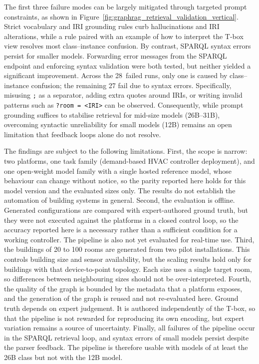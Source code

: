 \documentclass[twocolumn, 10pt, a4paper]{article}
\makeatletter
\renewcommand\section{\@startsection{section}{1}{\z@}{6pt}{3pt}{\normalfont\large\bfseries}}
\makeatother
\begin{document}
The first three failure modes can be largely mitigated through targeted prompt constraints, as shown in Figure~\ref{fig:graphrag_retrieval_validation_vertical}.
Strict vocabulary and IRI grounding rules curb hallucinations and IRI alterations, while a rule paired with an example of how to interpret the T-box view resolves most class--instance confusion.
By contrast, SPARQL syntax errors persist for smaller models.
Forwarding error messages from the SPARQL endpoint and enforcing syntax validation were both tested, but neither yielded a significant improvement.
Across the 28~failed runs, only one is caused by class--instance confusion; the remaining 27 fail due to syntax errors.
Specifically, misusing \texttt{;} as a separator, adding extra quotes around IRIs, or writing invalid patterns such as \texttt{?room = <IRI>} can be observed.
Consequently, while prompt grounding suffices to stabilise retrieval for mid-size models (26B--31B), overcoming syntactic unreliability for small models (12B) remains an open limitation that feedback loops alone do not resolve.


\section{Limitations and Conclusion}
\label{sec:limitations-conclusion}
The findings are subject to the following limitations.
First, the scope is narrow: two platforms, one task family (demand-based HVAC controller deployment), and one open-weight model family with a single hosted reference model, whose behaviour can change without notice, so the parity reported here holds for this model version and the evaluated sizes only. The results do not establish the automation of building systems in general.
Second, the evaluation is offline. Generated configurations are compared with expert-authored ground truth, but they were not executed against the platforms in a closed control loop, so the accuracy reported here is a necessary rather than a sufficient condition for a working controller. The pipeline is also not yet evaluated for real-time use.
Third, the buildings of 20 to 100 rooms are generated from two pilot installations. This controls building size and sensor availability, but the scaling results hold only for buildings with that device-to-point topology. Each size uses a single target room, so differences between neighbouring sizes should not be over-interpreted.
Fourth, the quality of the graph is bounded by the metadata that a platform exposes, and the generation of the graph is reused and not re-evaluated here. Ground truth depends on expert judgement. It is authored independently of the T-box, so that the pipeline is not rewarded for reproducing its own encoding, but expert variation remains a source of uncertainty.
Finally, all failures of the pipeline occur in the SPARQL retrieval loop, and syntax errors of small models persist despite the parser feedback. The pipeline is therefore usable with models of at least the 26B class but not with the 12B model.
\end{document}
